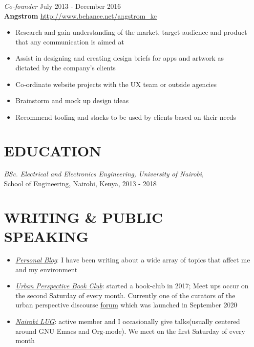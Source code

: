 \documentclass[margin, line]{res} %
\begin{document}
    {\sl Co-founder} \hfill July 2013 - December 2016\\
    \textbf{Angstrom} \hfill \url{http://www.behance.net/angstrom_ke}
    \begin{itemize} \itemsep -2pt %
    \item Research and gain understanding of the market, target audience and product that any communication is aimed at
    \item Assist in designing and creating design briefs for apps and artwork as dictated by the company's clients
    \item Co-ordinate website projects with the UX team or outside agencies
    \item Brainstorm and mock up design ideas
    \item Recommend tooling and stacks to be used by clients based on their needs
    \end{itemize}

    \section{EDUCATION}

    {\sl BSc. Electrical and Electronics Engineering, University of Nairobi},\\ School of Engineering, Nairobi, Kenya, 2013 - 2018


    \section{WRITING \& PUBLIC SPEAKING}

    \begin{itemize}
    \item \href{https://bonfacemunyoki.com}{\textit{Personal Blog}}:  I have been writing about a wide array of topics that affect me and my environment
    \item \href{https://upbookclub.com/}{\textit{Urban Perspective Book Club}}: started a book-club in 2017; Meet ups occur on the second Saturday of every month. Currently one of the curators of the urban perspective discourse \href{https://upbookclub.com}{forum} which was launched in September 2020
    \item \href{https://nairobilug.or.ke/}{\textit{Nairobi LUG}}: active member and I occasionally give talks(usually centered around GNU Emacs and Org-mode). We meet on the first Saturday of every month
    \end{itemize}

\end{document}
